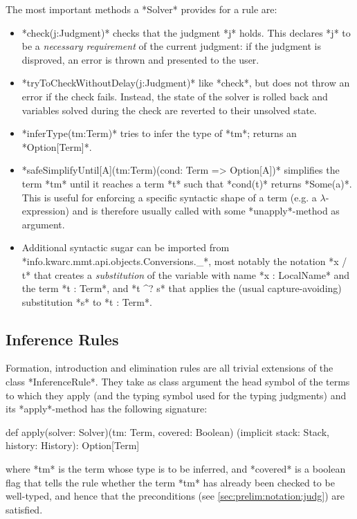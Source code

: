 The most important methods a *Solver* provides for a rule are:
\begin{itemize}
	\item *check(j:Judgment)* checks that the judgment *j* holds. This declares *j* to be a \emph{necessary requirement} of the current judgment: if the judgment is disproved, an error is thrown and presented to the user. 
	\item *tryToCheckWithoutDelay(j:Judgment)* like *check*, but does not throw an error if the check fails. Instead, the state of the solver is rolled back and variables solved during the check are reverted to their unsolved state.
	\item *inferType(tm:Term)* tries to infer the type of *tm*; returns an *Option[Term]*.
	\item *safeSimplifyUntil[A](tm:Term)(cond: Term => Option[A])* simplifies the term *tm* until it reaches a term *t* such that *cond(t)* returns *Some(a)*. This is useful for enforcing a specific syntactic shape of a term (e.g. a $\lambda$-expression) and is therefore usually called with some *unapply*-method as argument.
	\item Additional syntactic sugar can be imported from *info.kwarc.mmt.api.objects.Conversions._*, most notably the notation *x / t* that creates a \emph{substitution} of the variable with name *x : LocalName* and the term *t : Term*, and *t ^? s* that applies the (usual capture-avoiding) substitution *s* to *t : Term*.
\end{itemize}

\subsection{Inference Rules}\label{sec:lf:lfx:rules:inference}

Formation, introduction and elimination rules are all trivial extensions of the class *InferenceRule*. They take as class argument the head symbol of the terms to which they apply (and the typing symbol used for the typing judgments) and its *apply*-method has the following signature:
\begin{scalacode}
def apply(solver: Solver)(tm: Term, covered: Boolean)
	(implicit stack: Stack, history: History): Option[Term]
\end{scalacode}
where *tm* is the term whose type is to be inferred, and *covered* is a boolean flag that tells the rule whether the term *tm* has already been checked to be well-typed, and hence that the preconditions (see \autoref{sec:prelim:notation:judg}) are satisfied.

